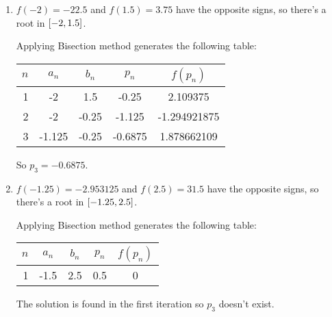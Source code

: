 \documentclass[../../Assignments.tex]{subfiles}
\begin{document}
\begin{solution}
    \begin{enumerate}[label = (\alph*)]
        \item \(f(-2) = \num{-22.5}\) and \(f(\num{1.5}) = \num{3.75}\) have the
            opposite signs, so there's a root in \(\interval{-2}{\num{1.5}}\).

            Applying Bisection method generates the following table:

            \begin{table}[H]
                \centering
                \begin{tabular}{r S[table-format=-1.3] S[table-format=-1.2] S[table-format=-1.4] S[table-format=-1.9]}
                    \toprule
                    \(n\)  &  {\(a_n\)}  &  {\(b_n\)}  &  {\(p_n\)}  &  {\(f(p_n)\)}  \\
                      &  -2         &   1.5       &  -0.25      &   2.109375     \\
                        2  &  -2         &  -0.25      &  -1.125     &  -1.294921875  \\
                        3  &  -1.125     &  -0.25      &  -0.6875    &   1.878662109  \\
                    \bottomrule
                \end{tabular}
            \end{table}

            So \(p_3 = \num{-0.6875}\).

        \item \(f(\num{-1.25}) = \num{-2.953125}\) and \(f(\num{2.5}) =
            \num{31.5}\) have the opposite signs, so there's a root in
            \(\interval{\num{-1.25}}{\num{2.5}}\).

            Applying Bisection method generates the following table:

            \begin{table}[H]
                \centering
                \begin{tabular}{r S[table-format=-1.1] S[table-format=1.1] S[table-format=1.1] S[table-format=1]}
                    \toprule
                    \(n\)  &  {\(a_n\)}  &  {\(b_n\)}  &  {\(p_n\)}  &  {\(f(p_n)\)}  \\
                       &  -1.5       &   2.5       &   0.5       &   0            \\
                    \bottomrule
                \end{tabular}
            \end{table}

            The solution is found in the first iteration so \(p_3\) doesn't
            exist.
    \end{enumerate}
\end{solution}
\end{document}
